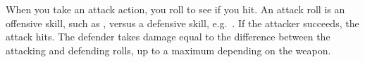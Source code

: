 
When you take an attack action, you roll to see if you hit. An attack roll is an offensive skill, such as , versus a defensive skill, e.g.\ . If the attacker succeeds, the attack hits. The defender takes damage equal to the difference between the attacking and defending rolls, up to a maximum depending on the weapon.
